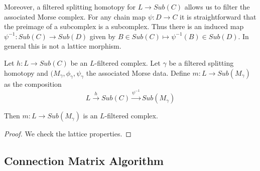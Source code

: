 Moreover, a filtered splitting homotopy for $L\to Sub(C)$ allows us to filter the associated Morse complex.  For any chain map $\psi:D\to C$ it is straightforward that the preimage of a subcomplex is a subcomplex.  Thus there is an induced map $\psi^{-1}:Sub(C)\to Sub(D)$ given by $B\in Sub(C)\mapsto \psi^{-1}(B)\in Sub(D)$.  In general this is not a lattice morphism.


\begin{prop}
Let $h:L\to Sub(C)$ be an $L$-filtered complex.  Let $\gamma$ be a filtered splitting homotopy and $(M_\gamma,\phi_\gamma,\psi_\gamma$ the associated Morse data. Define $m:L\to Sub(M_\gamma)$ as the composition $$L\xrightarrow{h} Sub(C) \xrightarrow{\psi^{-1}} Sub(M_\gamma)$$

Then  $m:L\to Sub(M_\gamma)$ is an $L$-filtered complex.
\end{prop}
\begin{proof}
We check the lattice properties.  

\end{proof}




%
%
%
%
%
%
%
%


\subsection{Connection Matrix Algorithm}

